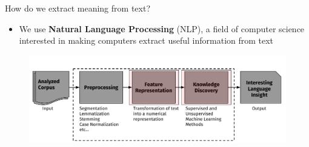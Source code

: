 \documentclass[10pt,xcolor=table]{beamer}
\begin{document}
\begin{frame}{How do we extract meaning from text?}

\begin{itemize}
\item[] {{We use \textbf{Natural Language Processing} (NLP), a field of computer science interested in making computers extract useful information from text}}
\end{itemize}
\begin{figure}
\centering
\includegraphics[width=1\linewidth]{image2/Chapitre1/nlp_flow2}
\end{figure}
\vspace{\textheight}
\end{frame}
\end{document}
